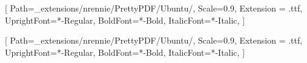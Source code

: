 \setsansfont{Ubuntu}[
    Path=_extensions/nrennie/PrettyPDF/Ubuntu/,
    Scale=0.9,
    Extension = .ttf,
    UprightFont=*-Regular,
    BoldFont=*-Bold,
    ItalicFont=*-Italic,
    ]

\setmainfont{Ubuntu}[
    Path=_extensions/nrennie/PrettyPDF/Ubuntu/,
    Scale=0.9,
    Extension = .ttf,
    UprightFont=*-Regular,
    BoldFont=*-Bold,
    ItalicFont=*-Italic,
    ]
    
\makeatletter
\renewenvironment{description}%
               {\list{}{\leftmargin=0pt %
                        \labelwidth\z@ \itemindent-\leftmargin
                        \let\makelabel\descriptionlabel}}%
               {\endlist}
\makeatother
